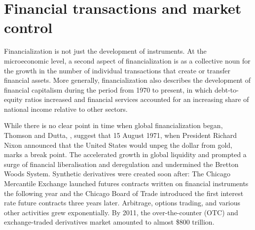 \section{Financial transactions and market control}

Financialization is not just the development of instruments. 
At the microeconomic level,  a second aspect of financialization is as a collective noun for the growth in the number of individual transactions that create or transfer financial assets. 
More generally, financialization also describes the development of financial capitalism during the period from 1970 to present, in which debt-to-equity ratios increased and financial services accounted for an increasing share of national income relative to other sectors. %

While there is no clear point in time when global financialization began, Thomson and Dutta,  \cite{thomsonFinancialisationPrimer2018}, suggest that 15 August 1971, when President Richard Nixon announced that the United States would unpeg the dollar from gold, marks a break point. The accelerated growth in global liquidity and prompted a surge of financial liberalisation and deregulation and undermined the Bretton Woods System.  Synthetic derivatives were created soon after: The Chicago Mercantile Exchange launched futures contracts written on financial instruments the following year and the Chicago Board of Trade introduced the first interest rate future contracts three years later. Arbitrage, options trading, and various other activities grew exponentially. By 2011, the over-the-counter (OTC) and exchange-traded derivatives market amounted to almost \$800 trillion.  %

